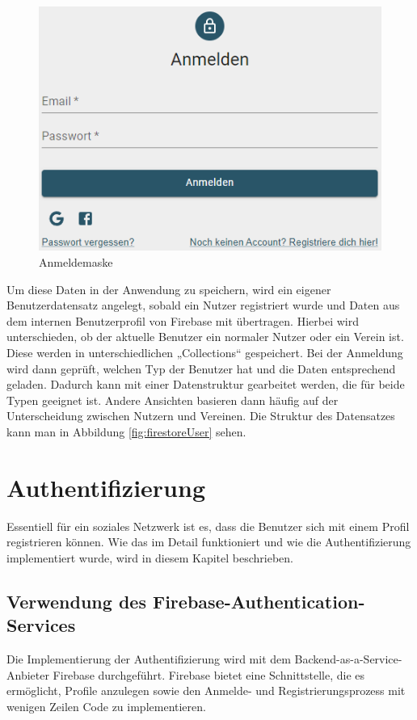 \begin{figure}[ht!]
    \begin{centering}
        \includegraphics[width=.75\textwidth]{figures/implementation/anmeldemaske.png}
        \caption{Anmeldemaske}
        \label{fig:login}
    \end{centering}
\end{figure}

Um diese Daten in der Anwendung zu speichern, wird ein eigener Benutzerdatensatz angelegt, sobald ein Nutzer registriert wurde und Daten aus dem internen Benutzerprofil von Firebase mit übertragen.
Hierbei wird unterschieden, ob der aktuelle Benutzer ein normaler Nutzer oder ein Verein ist.
Diese werden in unterschiedlichen „Collections“ gespeichert.
Bei der Anmeldung wird dann geprüft, welchen Typ der Benutzer hat und die Daten entsprechend geladen.
Dadurch kann mit einer Datenstruktur gearbeitet werden, die für beide Typen geeignet ist.
Andere Ansichten basieren dann häufig auf der Unterscheidung zwischen Nutzern und Vereinen.
Die Struktur des Datensatzes kann man in Abbildung \ref{fig:firestoreUser} sehen.

\section{Authentifizierung}
\label{sec:authentifizierung}

Essentiell für ein soziales Netzwerk ist es, dass die Benutzer sich mit einem Profil registrieren können. Wie das im Detail funktioniert und wie die Authentifizierung implementiert wurde, wird in diesem Kapitel beschrieben.

\subsection{Verwendung des \glqq Firebase-Authentication\grqq-Services}
\label{sec:firebase_authentifizierung}
Die Implementierung der Authentifizierung wird mit dem Backend-as-a-Service-Anbieter Firebase durchgeführt. Firebase bietet eine Schnittstelle, die es ermöglicht, Profile anzulegen sowie den Anmelde- und Registrierungsprozess mit wenigen Zeilen Code zu implementieren.

